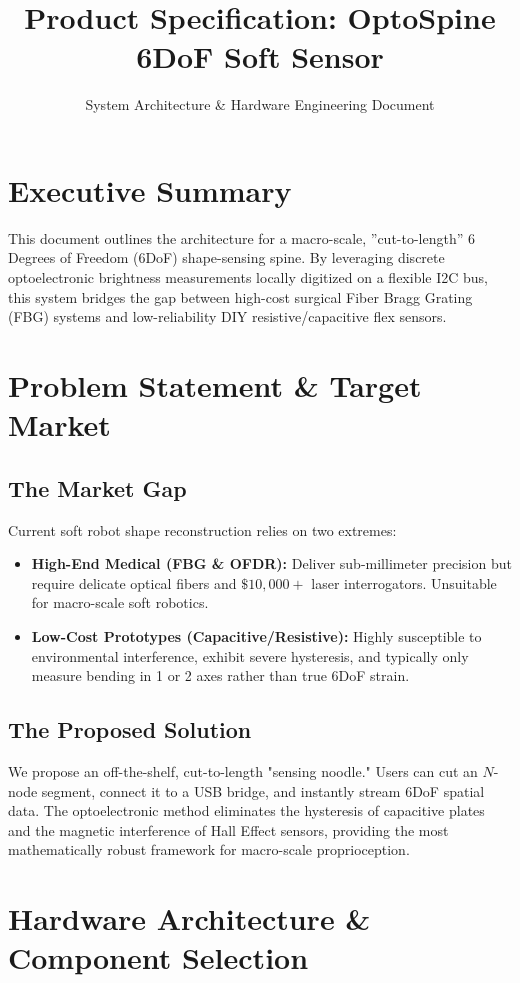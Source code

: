 \documentclass[11pt]{article}
\title{\textbf{Product Specification: OptoSpine 6DoF Soft Sensor}}
\author{System Architecture \& Hardware Engineering Document}
\date{}
\begin{document}
\maketitle

\section{Executive Summary}
This document outlines the architecture for a macro-scale, ''cut-to-length'' 6 Degrees of Freedom (6DoF) shape-sensing spine. By leveraging discrete optoelectronic brightness measurements locally digitized on a flexible I2C bus, this system bridges the gap between high-cost surgical Fiber Bragg Grating (FBG) systems and low-reliability DIY resistive/capacitive flex sensors.

\section{Problem Statement \& Target Market}
\subsection{The Market Gap}
Current soft robot shape reconstruction relies on two extremes:
\begin{itemize}
    \item \textbf{High-End Medical (FBG \& OFDR):} Deliver sub-millimeter precision but require delicate optical fibers and $\$10,000+$ laser interrogators. Unsuitable for macro-scale soft robotics.
    \item \textbf{Low-Cost Prototypes (Capacitive/Resistive):} Highly susceptible to environmental interference, exhibit severe hysteresis, and typically only measure bending in 1 or 2 axes rather than true 6DoF strain.
\end{itemize}

\subsection{The Proposed Solution}
We propose an off-the-shelf, cut-to-length "sensing noodle." Users can cut an $N$-node segment, connect it to a USB bridge, and instantly stream 6DoF spatial data. The optoelectronic method eliminates the hysteresis of capacitive plates and the magnetic interference of Hall Effect sensors, providing the most mathematically robust framework for macro-scale proprioception.

\section{Hardware Architecture \& Component Selection}
\end{document}
